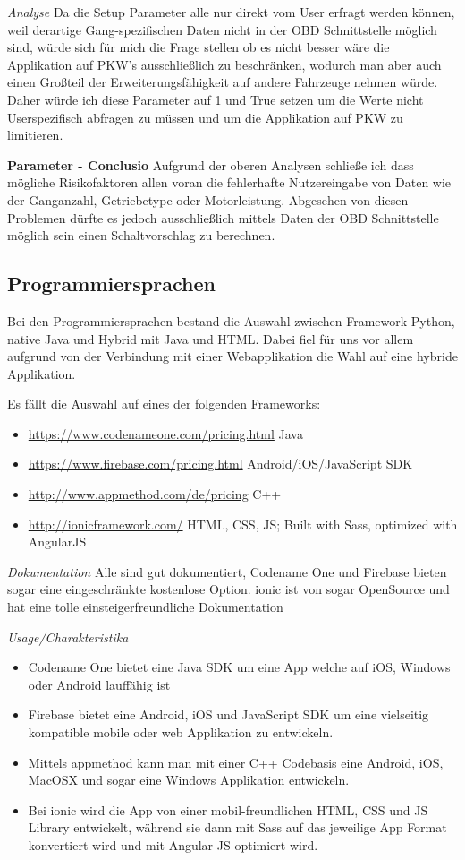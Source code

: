 	\textit{Analyse}
	Da die Setup Parameter alle nur direkt vom User erfragt werden können, weil derartige Gang-spezifischen Daten nicht in der OBD Schnittstelle möglich sind, würde sich für mich die Frage stellen ob es nicht besser wäre die Applikation auf PKW's ausschließlich zu beschränken, wodurch man aber auch einen Großteil der Erweiterungsfähigkeit auf andere Fahrzeuge nehmen würde. Daher würde ich diese Parameter auf 1 und True setzen um die Werte nicht Userspezifisch abfragen zu müssen und um die Applikation auf PKW zu limitieren. 

	\textbf{Parameter - Conclusio}
	Aufgrund der oberen Analysen schließe ich dass mögliche Risikofaktoren allen voran die fehlerhafte Nutzereingabe von Daten wie der Ganganzahl, Getriebetype oder Motorleistung. Abgesehen von diesen Problemen dürfte es jedoch ausschließlich mittels Daten der OBD Schnittstelle möglich sein einen Schaltvorschlag zu berechnen.


\subsection {Programmiersprachen}
Bei den Programmiersprachen bestand die Auswahl zwischen Framework Python, native Java und Hybrid mit Java und HTML.
Dabei fiel für uns vor allem aufgrund von der Verbindung mit einer Webapplikation die Wahl auf eine hybride Applikation. 

Es fällt die Auswahl auf eines der folgenden Frameworks:
\begin{itemize}
	\item \hyperref[Codename One]{https://www.codenameone.com/pricing.html} Java
	\item \hyperref[Firebase]{https://www.firebase.com/pricing.html} Android/iOS/JavaScript SDK
	\item \hyperref[appmethod]{http://www.appmethod.com/de/pricing} C++
	\item \hyperref[ionic]{http://ionicframework.com/} HTML, CSS, JS; Built with Sass, optimized with AngularJS
\end{itemize}

\textit{Dokumentation}
Alle sind gut dokumentiert, Codename One und Firebase bieten sogar eine eingeschränkte kostenlose Option.
ionic ist von sogar OpenSource und hat eine tolle einsteigerfreundliche Dokumentation

\textit{Usage/Charakteristika}
\begin{itemize}
	\item Codename One bietet eine Java SDK um eine App welche auf iOS, Windows oder Android lauffähig ist
	\item Firebase bietet eine Android, iOS und JavaScript SDK um eine vielseitig kompatible mobile oder web Applikation zu entwickeln. 
	\item Mittels appmethod kann man mit einer C++ Codebasis eine Android, iOS, MacOSX und sogar eine Windows Applikation entwickeln.
	\item Bei ionic wird die App von einer mobil-freundlichen HTML, CSS und JS Library entwickelt, während sie dann mit Sass auf das jeweilige App Format konvertiert wird und mit Angular JS optimiert wird. 
\end{itemize}

